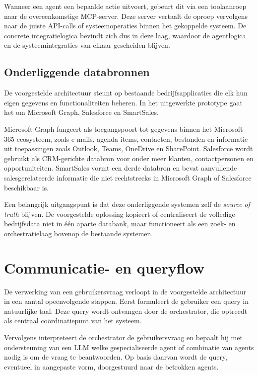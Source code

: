 Wanneer een agent een bepaalde actie uitvoert, gebeurt dit via een toolaanroep naar de overeenkomstige \gls{MCP}-server. Deze server vertaalt de oproep vervolgens naar de juiste \gls{API}-calls of systeemoperaties binnen het gekoppelde systeem. De concrete integratielogica bevindt zich dus in deze laag, waardoor de agentlogica en de systeemintegraties van elkaar gescheiden blijven.

\subsection{Onderliggende databronnen}
\label{subsec:databronnen}

De voorgestelde architectuur steunt op bestaande bedrijfsapplicaties die elk hun eigen gegevens en functionaliteiten beheren. In het uitgewerkte prototype gaat het om Microsoft Graph, Salesforce en SmartSales.

Microsoft Graph fungeert als toegangspoort tot gegevens binnen het Microsoft 365-ecosysteem, zoals e-mails, agenda-items, contacten, bestanden en informatie uit toepassingen zoals Outlook, Teams, OneDrive en SharePoint. Salesforce wordt gebruikt als \gls{CRM}-gerichte databron voor onder meer klanten, contactpersonen en opportuniteiten. SmartSales vormt een derde databron en bevat aanvullende salesgerelateerde informatie die niet rechtstreeks in Microsoft Graph of Salesforce beschikbaar is.

Een belangrijk uitgangspunt is dat deze onderliggende systemen zelf de \textit{source of truth} blijven. De voorgestelde oplossing kopieert of centraliseert de volledige bedrijfsdata niet in één aparte databank, maar functioneert als een zoek- en orchestratielaag bovenop de bestaande systemen.


\section{Communicatie- en queryflow}
\label{sec:queryflow}


De verwerking van een gebruikersvraag verloopt in de voorgestelde architectuur in een aantal opeenvolgende stappen. Eerst formuleert de gebruiker een query in natuurlijke taal. Deze query wordt ontvangen door de orchestrator, die optreedt als centraal coördinatiepunt van het systeem.

Vervolgens interpreteert de orchestrator de gebruikersvraag en bepaalt hij met ondersteuning van een \gls{LLM} welke gespecialiseerde agent of combinatie van agents nodig is om de vraag te beantwoorden. Op basis daarvan wordt de query, eventueel in aangepaste vorm, doorgestuurd naar de betrokken agents.

